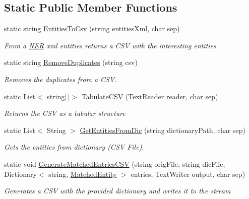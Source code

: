 \subsection*{Static Public Member Functions}
\begin{DoxyCompactItemize}
\item 
static string \hyperlink{class_a_t_p_r_n_e_r_1_1_c_s_v_utils_a6d40fcdbc82ad0745e7f47ace6695f8a}{Entities\+To\+Csv} (string entities\+Xml, char sep)
\begin{DoxyCompactList}\small\item\em From a \hyperlink{class_a_t_p_r_n_e_r_1_1_n_e_r}{N\+ER} xml entities returns a C\+SV with the interesting entities \end{DoxyCompactList}\item 
static string \hyperlink{class_a_t_p_r_n_e_r_1_1_c_s_v_utils_ab236c362e83053e0e7165aa2e45849c4}{Remove\+Duplicates} (string csv)
\begin{DoxyCompactList}\small\item\em Removes the duplicates from a C\+SV. \end{DoxyCompactList}\item 
static List$<$ string\mbox{[}$\,$\mbox{]}$>$ \hyperlink{class_a_t_p_r_n_e_r_1_1_c_s_v_utils_addabfb59d0e9755c0336b2de6b0bc9a4}{Tabulate\+C\+SV} (Text\+Reader reader, char sep)
\begin{DoxyCompactList}\small\item\em Returns the C\+SV as a tabular structure \end{DoxyCompactList}\item 
static List$<$ String $>$ \hyperlink{class_a_t_p_r_n_e_r_1_1_c_s_v_utils_a1fd132bc18c3722a06eb10f1aedf50cd}{Get\+Entities\+From\+Dic} (string dictionary\+Path, char sep)
\begin{DoxyCompactList}\small\item\em Gets the entities from dictionary (C\+SV File). \end{DoxyCompactList}\item 
static void \hyperlink{class_a_t_p_r_n_e_r_1_1_c_s_v_utils_a377f7a74bf9bb2672f1669f6d562cd67}{Generate\+Matched\+Entries\+C\+SV} (string orig\+File, string dic\+File, Dictionary$<$ string, \hyperlink{class_a_t_p_r_n_e_r_1_1_matched_entity}{Matched\+Entity} $>$ entries, Text\+Writer output, char sep)
\begin{DoxyCompactList}\small\item\em Generates a C\+SV with the provided dictionary and writes it to the stream \end{DoxyCompactList}\end{DoxyCompactItemize}


